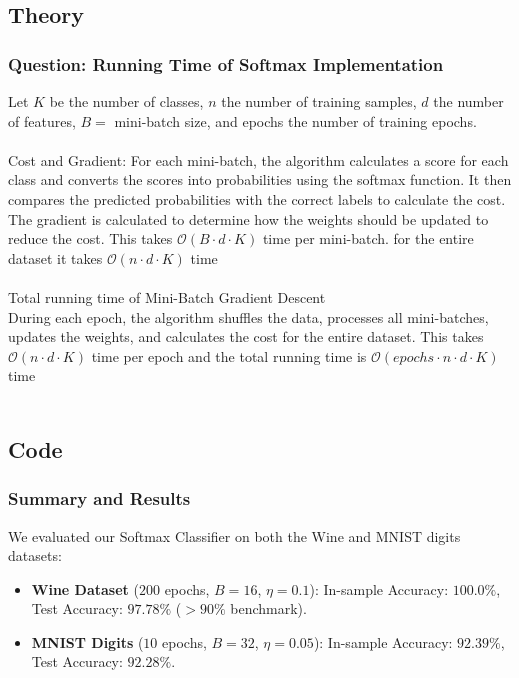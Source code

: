 \documentclass[12pt]{article}
\begin{document}
\subsection*{Theory}

\subsubsection*{Question: Running Time of Softmax Implementation}
Let $K$ be the number of classes, $n$ the number of training samples, $d$ the number of features, $B =$ mini-batch size, and epochs the number of training epochs.
\\\\
Cost and Gradient: For each mini-batch, the algorithm calculates a score for each class and converts the scores into probabilities using the softmax function. It then compares the predicted probabilities with the correct labels to calculate the cost. The gradient is calculated to determine how the weights should be updated to reduce the cost. This takes $\mathcal{O}(B\cdot d\cdot K)$ time per mini-batch. for the entire dataset it takes $\mathcal{O}(n\cdot d \cdot K)$ time
\\\\
Total running time of Mini-Batch Gradient Descent\\
During each epoch, the algorithm shuffles the data, processes all mini-batches, updates the weights, and calculates the cost for the entire dataset. This takes $\mathcal{O}(n\cdot d \cdot K)$ time per epoch and the total running time is $\mathcal{O}(epochs\cdot n\cdot d \cdot K)$ time
\\\




\subsection*{Code}

\subsubsection*{Summary and Results}
We evaluated our Softmax Classifier on both the Wine and MNIST digits datasets:
\begin{itemize}[noitemsep,topsep=1pt]
    \item \textbf{Wine Dataset} ($200$ epochs, $B=16$, $\eta=0.1$): In-sample Accuracy: $100.0\%$, Test Accuracy: $97.78\%$ ($> 90\%$ benchmark).
    \item \textbf{MNIST Digits} ($10$ epochs, $B=32$, $\eta=0.05$): In-sample Accuracy: $92.39\%$, Test Accuracy: $92.28\%$.
\end{itemize}
\end{document}
